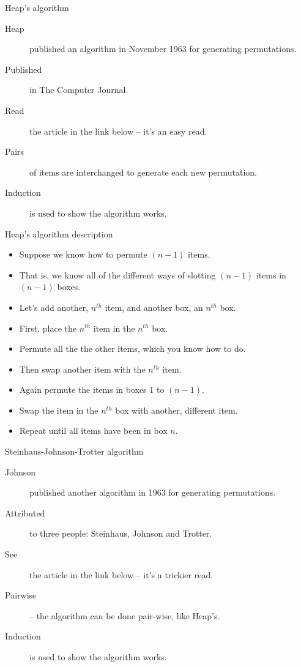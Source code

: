 \begin{frame}[fragile]{Heap's algorithm}
  \begin{description}
    \item[Heap] published an algorithm in November 1963 for generating permutations.
    \item[Published] in The Computer Journal.
    \item[Read] the article in the link below -- it's an easy read.
    \item[Pairs] of items are interchanged to generate each new permutation.
    \item[Induction] is used to show the algorithm works.
  \end{description}
\end{frame}

\begin{frame}[fragile]{Heap's algorithm description}
  \begin{itemize}
    \item Suppose we know how to permute $(n-1)$ items.
    \item That is, we know all of the different ways of slotting $(n-1)$ items in $(n-1)$ boxes.
    \item Let's add another, $n^{th}$ item, and another box, an $n^{th}$ box.
    \item First, place the $n^{th}$ item in the $n^{th}$ box.
    \item Permute all the the other items, which you know how to do.
    \item Then swap another item with the $n^{th}$ item.
    \item Again permute the items in boxes $1$ to $(n-1)$.
    \item Swap the item in the $n^{th}$ box with another, different item.
    \item Repeat until all items have been in box $n$.
  \end{itemize}
\end{frame}

\begin{frame}{Steinhaus-Johnson-Trotter algorithm}
  \begin{description}
    \item[Johnson] published another algorithm in 1963 for generating permutations.
    \item[Attributed] to three people: Steinhaus, Johnson and Trotter.
    \item[See] the article in the link below -- it's a trickier read.
    \item[Pairwise] -- the algorithm can be done pair-wise, like Heap's.
    \item[Induction] is used to show the algorithm works.
  \end{description}
\end{frame}

